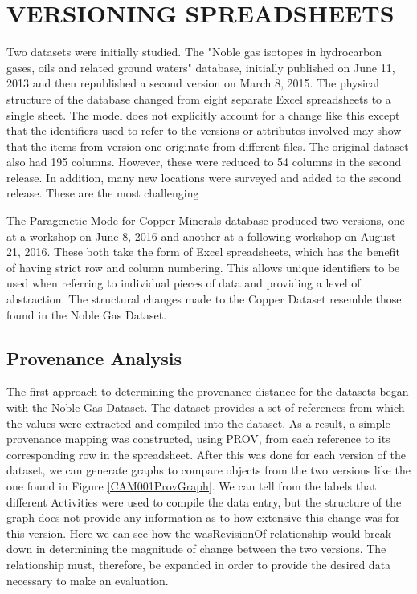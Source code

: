 
\chapter{VERSIONING SPREADSHEETS}\label{ch:spreadsheet}

Two datasets were initially studied.  The "Noble gas isotopes in hydrocarbon gases, oils and related ground waters" database, initially published on June 11, 2013 and then republished a second version on March 8, 2015.  The physical structure of the database changed from eight separate Excel spreadsheets to a single sheet.  The model does not explicitly account for a change like this except that the identifiers used to refer to the versions or attributes involved may show that the items from version one originate from different files.  The original dataset also had 195 columns.  However, these were reduced to 54 columns in the second release.  In addition, many new locations were surveyed and added to the second release.  These are the most challenging 

The Paragenetic Mode for Copper Minerals database produced two versions, one at a workshop on June 8, 2016 and another at a following workshop on August 21, 2016.  These both take the form of Excel spreadsheets, which has the benefit of having strict row and column numbering. This allows unique identifiers to be used when referring to individual pieces of data and providing a level of abstraction.  The structural changes made to the Copper Dataset resemble those found in the Noble Gas Dataset.

\section{Provenance Analysis}

The first approach to determining the provenance distance for the datasets began with the Noble Gas Dataset.  The dataset provides a set of references from which the values were extracted and compiled into the dataset.  As a result, a simple provenance mapping was constructed, using PROV, from each reference to its corresponding row in the spreadsheet.  After this was done for each version of the dataset, we can generate graphs to compare objects from the two versions like the one found in Figure \ref{CAM001ProvGraph}.  We can tell from the labels that different Activities were used to compile the data entry, but the structure of the graph does not provide any information as to how extensive this change was for this version.  Here we can see how the wasRevisionOf relationship would break down in determining the magnitude of change between the two versions.  The relationship must, therefore, be expanded in order to provide the desired data necessary to make an evaluation.

